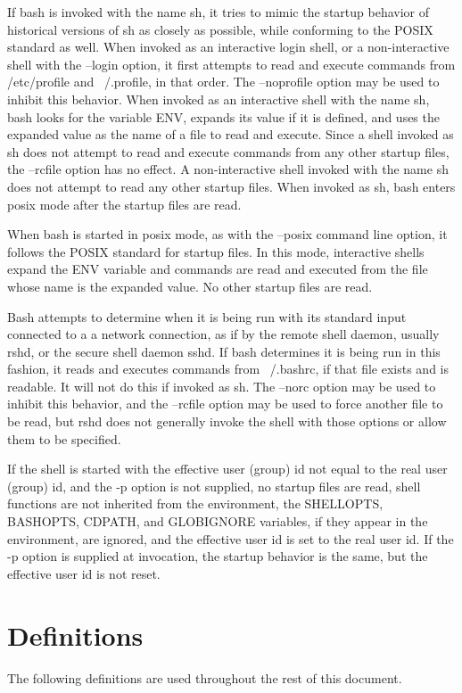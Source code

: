 \documentclass[11pt]{article}
\begin{document}
If bash is invoked with the name sh, it tries to mimic the startup behavior of historical versions of sh as closely as possible, while conforming to the POSIX standard as well. When invoked as an interactive login shell, or a non-interactive shell with the --login option, it first attempts to read and execute commands from /etc/profile and ~/.profile, in that order. The --noprofile option may be used to inhibit this behavior. When invoked as an interactive shell with the name sh, bash looks for the variable ENV, expands its value if it is defined, and uses the expanded value as the name of a file to read and execute. Since a shell invoked as sh does not attempt to read and execute commands from any other startup files, the --rcfile option has no effect. A non-interactive shell invoked with the name sh does not attempt to read any other startup files. When invoked as sh, bash enters posix mode after the startup files are read.

When bash is started in posix mode, as with the --posix command line option, it follows the POSIX standard for startup files. In this mode, interactive shells expand the ENV variable and commands are read and executed from the file whose name is the expanded value. No other startup files are read.

Bash attempts to determine when it is being run with its standard input connected to a a network connection, as if by the remote shell daemon, usually rshd, or the secure shell daemon sshd. If bash determines it is being run in this fashion, it reads and executes commands from ~/.bashrc, if that file exists and is readable. It will not do this if invoked as sh. The --norc option may be used to inhibit this behavior, and the --rcfile option may be used to force another file to be read, but rshd does not generally invoke the shell with those options or allow them to be specified.

If the shell is started with the effective user (group) id not equal to the real user (group) id, and the -p option is not supplied, no startup files are read, shell functions are not inherited from the environment, the SHELLOPTS, BASHOPTS, CDPATH, and GLOBIGNORE variables, if they appear in the environment, are ignored, and the effective user id is set to the real user id. If the -p option is supplied at invocation, the startup behavior is the same, but the effective user id is not reset.

\section{Definitions}
\label{sec:definitions}
The following definitions are used throughout the rest of this document.
\end{document}
